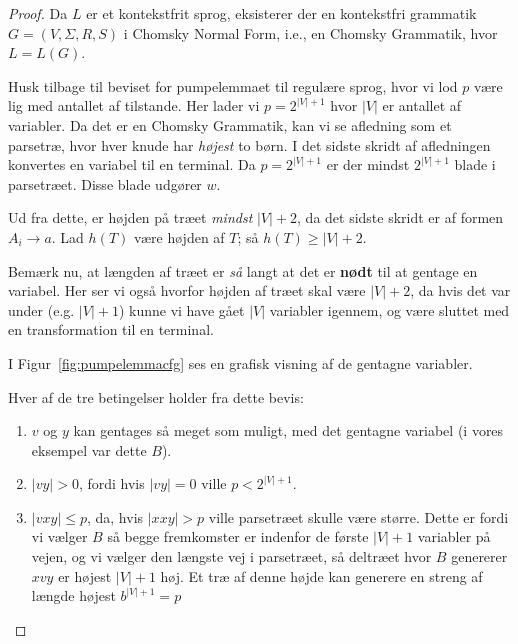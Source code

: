 \begin{proof}
	Da $L$ er et kontekstfrit sprog, eksisterer der en kontekstfri grammatik $G = (V, \Sigma, R, S)$ i Chomsky Normal Form, i.e., en Chomsky Grammatik, hvor $L = L(G)$.

	Husk tilbage til beviset for pumpelemmaet til regulære sprog, hvor vi lod $p$ være lig med antallet af tilstande. Her lader vi $p = 2^{|V| +1}$ hvor $|V|$ er antallet af variabler. Da det er en Chomsky Grammatik, kan vi se afledning som et parsetræ, hvor hver knude har \textit{højest} to børn. I det sidste skridt af afledningen konvertes en variabel til en terminal. Da $p = 2^{|V|+1}$ er der mindst $2^{|V|+1}$ blade i parsetræet. Disse blade udgører $w$.

	Ud fra dette, er højden på træet \textit{mindst} $|V|+2$, da det sidste skridt er af formen $A_{i} \rightarrow a$. Lad $h(T)$ være højden af $T$; så $h(T) \ge |V|+2$.

	Bemærk nu, at længden af træet er \textit{så} langt at det er \textbf{nødt} til at gentage en variabel. Her ser vi også hvorfor højden af træet skal være $|V|+2$, da hvis det var under (e.g. $|V|+1$) kunne vi have gået $|V|$ variabler igennem, og være sluttet med en transformation til en terminal.

	I Figur~\ref{fig:pumpelemmacfg} ses en grafisk visning af de gentagne variabler.

	Hver af de tre betingelser holder fra dette bevis:
	\begin{enumerate}
		\item $v$ og $y$ kan gentages så meget som muligt, med det gentagne variabel (i vores eksempel var dette $B$).
		\item $|vy| > 0$, fordi hvis $|vy| = 0$ ville $p < 2^{|V|+1}$.
		\item $|vxy| \le p$, da, hvis $|xxy| > p$ ville parsetræet skulle være større. Dette er fordi vi vælger $B$ så begge fremkomster er indenfor de første $|V|+1$ variabler på vejen, og vi vælger den længste vej i parsetræet, så deltræet hvor $B$ genererer $xvy$ er højest $|V|+1$ høj. Et træ af denne højde kan generere en streng af længde højest $b^{|V|+1} = p$
	\end{enumerate}
\end{proof}

